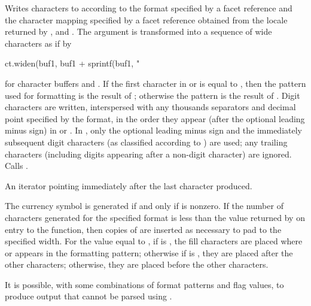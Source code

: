 \begin{itemdescr}
\pnum
\effects
Writes characters to  according to
the format specified by
a  facet reference  and
the character mapping specified by
a  facet reference 
obtained from the locale returned by ,
and .
The argument  is transformed into
a sequence of wide characters as if by
\begin{codeblock}
ct.widen(buf1, buf1 + sprintf(buf1, "%
\end{codeblock}
for character buffers  and .
If the first character in  or 
is equal to ,
then the pattern used for formatting is the result of ;
otherwise the pattern is the result of .
Digit characters are written,
interspersed with any thousands separators and decimal point
specified by the format,
in the order they appear (after the optional leading minus sign) in
 or .
In ,
only the optional leading minus sign and
the immediately subsequent digit characters
(as classified according to )
are used;
any trailing characters
(including digits appearing after a non-digit character)
are ignored.
Calls .

\pnum
\returns
An iterator pointing immediately after the last character produced.

\pnum
\remarks
The currency symbol is generated
if and only if  is nonzero.
If the number of characters generated for the specified format
is less than the value returned by  on entry to the function,
then copies of  are inserted as necessary
to pad to the specified width.
For the value  equal to ,
if  is ,
the fill characters are placed
where  or  appears in the formatting pattern;
otherwise if  is ,
they are placed after the other characters;
otherwise, they are placed before the other characters.
\begin{note}
It is possible, with some combinations of format patterns and flag values,
to produce output that cannot be parsed using .
\end{note}
\end{itemdescr}

